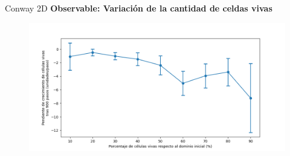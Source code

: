 
\begin{frame}{Conway 2D}
    \textbf{Observable: Variación de la cantidad de celdas vivas}
    \begin{figure}[H]
        \centering
        \includegraphics[width=0.8\linewidth]{pic/conway2d/size_slope_vs_input}
        \label{fig:conway2d:size_slope:density}
    \end{figure}
\end{frame}

